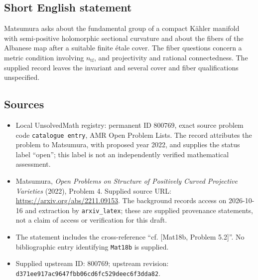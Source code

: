 \documentclass[11pt]{article}
\begin{document}
\subsection{Short English statement}
Matsumura asks about the fundamental group of a compact K\"ahler manifold with semi-positive holomorphic sectional curvature and about the fibers of the Albanese map after a suitable finite \'etale cover. The fiber questions concern a metric condition involving \(n_{\mathrm{tf}}\), and projectivity and rational connectedness. The supplied record leaves the invariant and several cover and fiber qualifications unspecified.
\subsection{Sources}
\begin{itemize}
\item Local UnsolvedMath registry: permanent ID \(800769\), exact source problem code \texttt{catalogue entry}, AMR Open Problem Lists. The record attributes the problem to Matsumura, with proposed year 2022, and supplies the status label ``open''; this label is not an independently verified mathematical assessment.
\item Matsumura, \emph{Open Problems on Structure of Positively Curved Projective Varieties} (2022), Problem 4. Supplied source URL: \url{https://arxiv.org/abs/2211.09153}. The background records access on 2026-10-16 and extraction by \texttt{arxiv\_latex}; these are supplied provenance statements, not a claim of access or verification for this draft.
\item The statement includes the cross-reference ``cf. [Mat18b, Problem 5.2]''. No bibliographic entry identifying \texttt{Mat18b} is supplied.
\item Supplied upstream ID: \(800769\); upstream revision: \texttt{d371ee917ac9647fbb06cd6fc529deec6f3dda82}.
\end{itemize}
\end{document}
